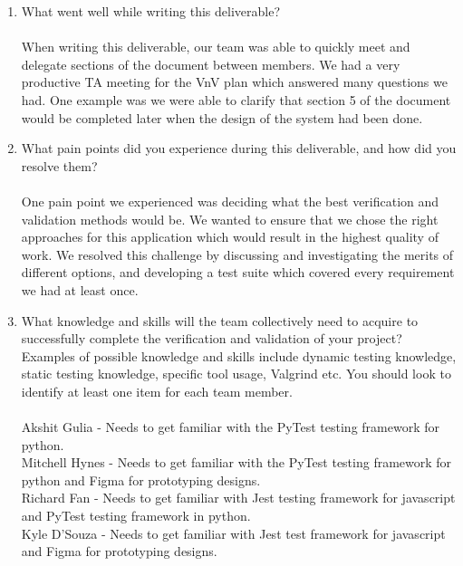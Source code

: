 \documentclass[12pt, titlepage]{article}
\begin{document}
\begin{enumerate}
  \item What went well while writing this deliverable?\\
    \\
    When writing this deliverable, our team was able to quickly meet
    and delegate
    sections of the document between members. We had a very productive TA
    meeting for the VnV plan which answered many questions we had. One example
    was we were able to clarify that section 5 of the document would be
    completed later when the design of the system had been done.

  \item What pain points did you experience during this deliverable, and how
    did you resolve them?\\
    \\
    One pain point we experienced was deciding what the best verification and
    validation methods would be. We wanted to ensure that we chose the right
    approaches for this application which would result in the highest quality
    of work. We resolved this challenge by discussing and investigating the
    merits of different options, and developing a test suite which covered
    every requirement we had at least once.

  \item What knowledge and skills will the team collectively need to acquire to
    successfully complete the verification and validation of your project?
    Examples of possible knowledge and skills include dynamic
    testing knowledge,
    static testing knowledge, specific tool usage, Valgrind etc.  You
    should look to
    identify at least one item for each team member.\\
    \\

    Akshit Gulia - Needs to get familiar with the PyTest testing
    framework for python. \\

    Mitchell Hynes - Needs to get familiar with the PyTest testing
    framework for python and Figma for prototyping designs. \\

    Richard Fan - Needs to get familiar with Jest testing framework
    for javascript and PyTest testing framework in python. \\

    Kyle D'Souza - Needs to get familiar with Jest test framework for
    javascript and Figma for prototyping designs. \\


\end{enumerate}
\end{document}
